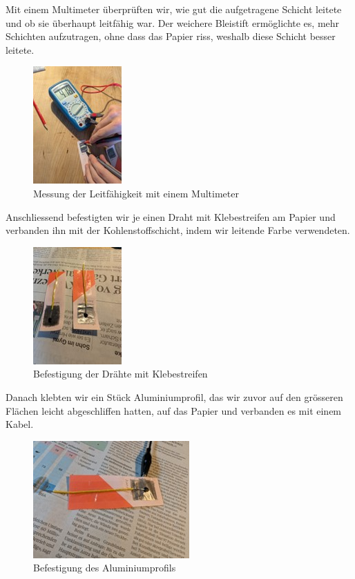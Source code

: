 \documentclass[ngerman, a4paper,12pt]{article}
\begin{document}
\noindent Mit einem Multimeter überprüften wir, wie gut die aufgetragene Schicht leitete und ob sie überhaupt leitfähig war. Der weichere Bleistift ermöglichte es, mehr Schichten aufzutragen, ohne dass das Papier riss, weshalb diese Schicht besser leitete.
\begin{figure}[htbp]
	\centering
	\includegraphics[height=0.3\textheight]{Bild2.jpg}
	\caption{Messung der Leitfähigkeit mit einem Multimeter}\label{fig:bild2}
\end{figure}

\vspace{12px}

\noindent Anschliessend befestigten wir je einen Draht mit Klebestreifen am Papier und verbanden ihn mit der Kohlenstoffschicht, indem wir leitende Farbe verwendeten.
\begin{figure}[htbp]
	\centering
	\includegraphics[height=0.3\textheight]{Bild3.jpg}
	\caption{Befestigung der Drähte mit Klebestreifen}\label{fig:bild3}
\end{figure}
\newpage

\noindent 
\sloppy 
Danach klebten wir ein Stück Aluminiumprofil, das wir zuvor auf den grösseren Flächen leicht abgeschliffen hatten, auf das Papier und verbanden es mit einem Kabel.
\begin{figure}[htbp]
	\centering
	\includegraphics[height=0.3\textheight]{Bild4.jpg}
	\caption{Befestigung des Aluminiumprofils}\label{fig:bild4}
\end{figure}
\end{document}
